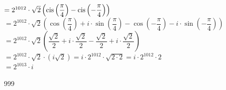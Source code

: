 \documentclass[a4paper]{article}
\begin{document}
$= 2^{1012} \cdot \sqrt{2} \left(\operatorname{cis} \left(\dfrac{\pi}{4}\right) - \operatorname{cis} \left(- \dfrac{\pi}{4}\right)\right)$\\

$= 2^{1012} \cdot \sqrt{2} \left(\cos \left(\dfrac{\pi}{4}\right) + i \cdot \sin \left(\dfrac{\pi}{4}\right) - \cos \left(- \dfrac{\pi}{4}\right) - i \cdot \sin \left(- \dfrac{\pi}{4}\right)\right)$\\

$= 2^{1012} \cdot \sqrt{2} \left(\dfrac{\sqrt{2}}{2} + i \cdot \dfrac{\sqrt{2}}{2} - \dfrac{\sqrt{2}}{2} + i \cdot \dfrac{\sqrt{2}}{2}\right)$\\

$= 2^{1012} \cdot \sqrt{2} \cdot (i\sqrt{2}) = i \cdot 2^{1012} \cdot \sqrt{2 \cdot 2} = i \cdot 2^{1012} \cdot 2$\\

$= 2^{1013} \cdot i$\\

\begin{thebibliography}{999}
\end{thebibliography}
\end{document}

